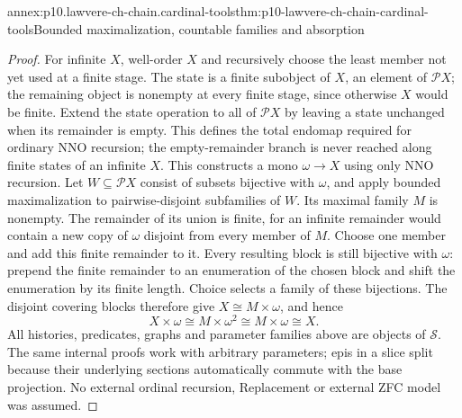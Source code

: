 \begin{annexitem}{annex:p10.lawvere-ch-chain.cardinal-tools}{thm:p10-lawvere-ch-chain-cardinal-tools}{Bounded maximalization, countable families and absorption}
\begin{proof}
For infinite \(X\), well-order \(X\) and recursively choose the least
member not yet used at a finite stage. The state is a finite subobject of
\(X\), an element of \(\mathcal P X\); the remaining object is nonempty
at every finite stage, since otherwise \(X\) would be finite.
Extend the state operation to all of \(\mathcal P X\) by leaving a
state unchanged when its remainder is empty. This defines the total
endomap required for ordinary NNO recursion; the empty-remainder branch
is never reached along finite states of an infinite \(X\).
This constructs a mono \(\omega\to X\) using only NNO recursion.
Let \(W\subseteq\mathcal P X\) consist of subsets bijective with
\(\omega\), and apply bounded maximalization to pairwise-disjoint
subfamilies of \(W\). Its maximal family \(M\) is nonempty. The remainder
of its union is finite, for an infinite remainder would contain a new
copy of \(\omega\) disjoint from every member of \(M\).
Choose one member and add this finite remainder to it.
Every resulting block is still bijective with \(\omega\): prepend the
finite remainder to an enumeration of the chosen block and shift the
enumeration by its finite length. Choice selects a family of these
bijections. The disjoint covering blocks therefore give
\(X\cong M\times\omega\), and hence
\[
       X\times\omega\cong M\times\omega^2\cong M\times\omega\cong X.
 \]
All histories, predicates, graphs and parameter families above are
objects of \(\mathcal S\). The same internal proofs work with arbitrary
parameters; epis in a slice split because their underlying sections
automatically commute with the base projection. No external ordinal
recursion, Replacement or external ZFC model was assumed.
\end{proof}
\end{annexitem}

